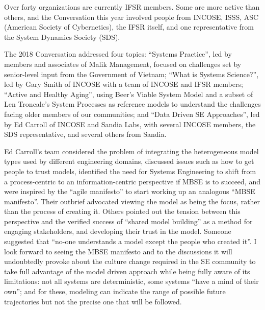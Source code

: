 Over forty organizations are currently IFSR members. Some are more active than others, and the Conversation this year involved people from INCOSE, ISSS, ASC (American Society of Cybernetics), the IFSR itself, and one representative from the System Dynamics Society (SDS).

The 2018 Conversation addressed four topics: ``Systems Practice'', led by members and associates of Malik Management, focused on challenges set by senior-level input from the Government of Vietnam; ``What is Systems Science?'', led by Gary Smith of INCOSE with a team of INCOSE and IFSR members; ``Active and Healthy Aging'', using Beer’s Viable System Model and a subset of Len Troncale’s System Processes as reference models to understand the challenges facing older members of our communities; and ``Data Driven SE Approaches'', led by Ed Carroll of INCOSE and Sandia Labs, with several INCOSE members, the SDS representative, and several others from Sandia.

Ed Carroll’s team considered the problem of integrating the heterogeneous model types used by different engineering domains, discussed issues such as how to get people to trust models, identified the need for Systems Engineering to shift from a process-centric to an information-centric perspective if MBSE is to succeed, and were inspired by the ``agile manifesto'' to start working up an analogous ``MBSE manifesto''. Their outbrief advocated viewing the model as being the focus, rather than the process of creating it. Others pointed out the tension between this perspective and the verified success of ``shared model building'' as a method for engaging stakeholders, and developing their trust in the model. Someone suggested that ``no-one understands a model except the people who created it''. I look forward to seeing the MBSE manifesto and to the discussions it will undoubtedly provoke about the culture change required in the SE community to take full advantage of the model driven approach while being fully aware of its limitations: not all systems are deterministic, some systems ``have a mind of their own''; and for these, modeling can indicate the range of possible future trajectories but not the precise one that will be followed.

